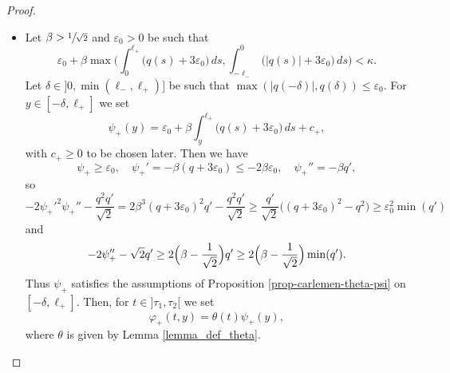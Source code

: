\documentclass[10pt]{amsart}
\theoremstyle{plain}
\theoremstyle{definition}
\newcommand{\abs}[1]{\vert #1\vert}
\newcommand{\1}{\mathds 1}
\let\d\delta
\let\e\varepsilon
\let\th\theta
\let\k\kappa
\let\f\varphi
\begin{document}
\skpt
\begin{proof}
\begin{itemize}
\item
Let $\beta > \sfrac 1 {\sqrt 2}$ and $\e_0 > 0$ be such that
\begin{equation} \label{eq-eps-kappa}
\e_0 + \beta \max\biggl(\int_{0}^{\ell_+} \bigl(q(s) + 3 \e_0 \bigr) \, ds, \int_{-\ell_-}^0 \bigl(\abs{q(s)} + 3 \e_0 \bigr) \,ds \biggr) < \k.
\end{equation}
Let $\d \in{}]0,\min(\ell_-,\ell_+)]$ be such that $\max(\abs{q(-\delta)},q(\delta)) \leq \e_0$. For $y \in [-\d,\ell_+]$ we set
\[
\psi_+(y) = \e_0 + \beta \int_{y}^{\ell_+} \bigl(q(s)+3\e_0 \bigr) \, ds + c_+,
\]
with $c_+ \geq 0$ to be chosen later.
Then we have
\[
\psi_+ \geq \e_0, \quad \psi_+' = -\beta (q + 3 \e_0) \leq - 2 \beta \e_0, \quad \psi_+'' = - \beta q',
\]
so
\[
- 2 \psi_+'^2 \psi_+'' - \frac {q^2 q'}{\sqrt 2}
 = 2 \beta^3 (q+3\e_0)^2 q' - \frac {q^2 q'}{\sqrt 2}\geq \frac {q'}{\sqrt 2} \bigl((q+3\e_0)^2 - q^2 \bigr)\geq \e_0^2 \min(q')
\]
and
\[
- 2 \psi_+'' - \sqrt 2 q' \geq 2 \Bigl(\beta - \frac{1}{\sqrt 2}\Bigr) q' \geq 2 \Bigl(\beta - \frac{1}{\sqrt 2}\Bigr) \min(q').
\]
Thus $\psi_+$ satisfies the assumptions of Proposition \ref{prop-carlemen-theta-psi} on $[-\d,\ell_+]$.
Then, for $t \in{}]\tau_1,\tau_2[$ we set
\begin{equation} \label{def-phi-+}
\f_+(t,y) = \th(t) \psi_+(y),
\end{equation}
where $\th$ is given by Lemma \ref{lemma_def_theta}.


\end{itemize}
\end{proof}
\end{document}
